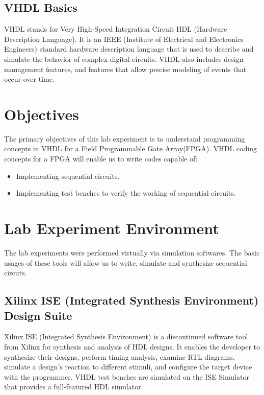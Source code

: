 \documentclass{lab_sheet}
\begin{document}
    \subsection{VHDL Basics}
    VHDL stands for Very High-Speed Integration Circuit HDL (Hardware Description Language). It is an IEEE (Institute of Electrical and Electronics Engineers) standard hardware description language that is used to describe and simulate the behavior of complex digital circuits. VHDL also includes design management features, and features that allow precise modeling of events that occur over time.
    \section{Objectives}
    The primary objectives of this lab experiment is to understand programming concepts in VHDL for a Field Programmable Gate Array(FPGA). VHDL coding concepts for a FPGA will enable us to write codes capable of:
    \begin{itemize}
        \item Implementing sequential circuits.
        \item Implementing test benches to verify the working of sequential circuits.
    \end{itemize}
    \section{Lab Experiment Environment}
    The lab experiments were performed virtually via simulation softwares. The basic usages of these tools will allow us to write, simulate and synthesize sequential circuts.
    \subsection{Xilinx ISE (Integrated Synthesis Environment) Design Suite}
    Xilinx ISE (Integrated Synthesis Environment) is a discontinued software tool from Xilinx for synthesis and analysis of HDL designs. It enables the developer to synthesize their designs, perform timing analysis, examine RTL diagrams, simulate a design's reaction to different stimuli, and configure the target device with the programmer. VHDL test benches are simulated on the ISE Simulator that provides a full-featured HDL simulator.
\end{document}
